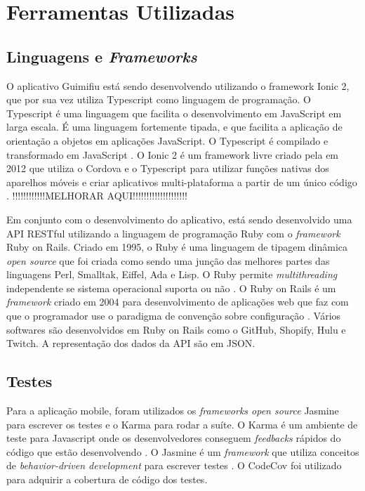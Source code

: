 \section{Ferramentas Utilizadas}

\subsection{Linguagens e \textit{Frameworks}}

O aplicativo Guimifiu está sendo desenvolvendo utilizando o framework Ionic 2, que por sua vez utiliza Typescript como linguagem de programação. O Typescript é uma linguagem que facilita o desenvolvimento em JavaScript em larga escala. É uma linguagem fortemente tipada, e que facilita a aplicação de orientação a objetos em aplicações JavaScript. O Typescript é compilado e transformado em JavaScript \cite{typescript}. O Ionic 2 é um framework livre criado pela em 2012 que utiliza o Cordova e o Typescript para utilizar funções nativas dos aparelhos móveis e criar aplicativos multi-plataforma a partir de um único código \cite{ionic-2}. !!!!!!!!!!!!MELHORAR AQUI!!!!!!!!!!!!!!!!!!!! 

Em conjunto com o desenvolvimento do aplicativo, está sendo desenvolvido uma API RESTful utilizando a linguagem de programação Ruby com o \textit{framework} Ruby on Rails. Criado em 1995, o Ruby é uma linguagem de tipagem dinâmica \textit{open source} que foi criada como sendo uma junção das melhores partes das linguagens Perl, Smalltak, Eiffel, Ada e Lisp. O Ruby permite \textit{multithreading} independente se sistema operacional suporta ou não \cite{ruby-wow}. O Ruby on Rails é um \textit{framework} criado em 2004 para desenvolvimento de aplicações web que faz com que o programador use o paradigma de convenção sobre configuração \cite{rails}. Vários softwares são desenvolvidos em Ruby on Rails como o GitHub, Shopify, Hulu e Twitch. A representação dos dados da API são em JSON.

\subsection{Testes}

Para a aplicação mobile, foram utilizados os \textit{frameworks open source} Jasmine para escrever os testes e o Karma para rodar a suíte. O Karma é um ambiente de teste para Javascript onde os desenvolvedores conseguem \textit{feedbacks} rápidos do código que estão desenvolvendo \cite{karma}. O Jasmine é um \textit{framework} que utiliza conceitos de \textit{behavior-driven development} para escrever testes \cite{jasmine}. O CodeCov foi utilizado para adquirir a cobertura de código dos testes.

